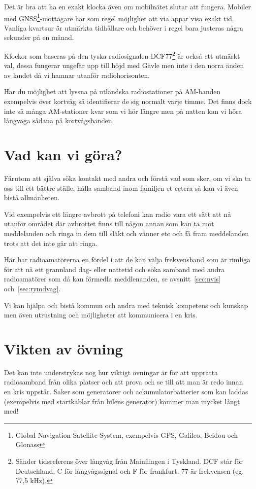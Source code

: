 Det är bra att ha en exakt klocka även om mobilnätet slutar att fungera.
Mobiler med GNSS\footnote{Global Navigation Satellite System, exempelvis GPS,
Galileo, Beidou och Glonass}-mottagare har som regel möjlighet att via appar
visa exakt tid. Vanliga kvartsur är utmärkta tidhållare och behöver i regel
bara justeras några sekunder på en månad.

Klockor som baseras på den tyska radiosignalen DCF77\footnote{Sänder
tidsreferens över långvåg från Mainflingen i Tyskland. DCF står för
Deutschland, C för långvågssignal och F för frankfurt. 77 är frekvensen (eg.
77,5 kHz).} är också ett utmärkt val, dessa fungerar ungefär upp till höjd med
Gävle men inte i den norra änden av landet då vi hamnar utanför
radiohorisonten.

Har du möjlighet att lyssna på utländska radiostationer på AM-banden
exempelvis över kortvåg så identifierar de sig normalt varje timme. Det finns
dock inte så många AM-stationer kvar som vi hör längre men på natten kan vi
höra långväga sådana på kortvågsbanden.

\section{Vad kan vi göra?}

Färutom att själva söka kontakt med andra och förstå vad som sker, om vi ska
ta oss till ett bättre ställe, hålla samband inom familjen et cetera så kan vi
även bistå allmänheten.

Vid exempelvis ett längre avbrott på telefoni kan radio vara ett sätt att nå
utanför området där avbrottet finns till någon annan som kan ta mot
meddelanden och ringa in dem till släkt och vänner etc och få fram meddelanden
trots att det inte går att ringa.

Här har radioamatörerna en fördel i att de kan välja frekvensband som är
rimliga för att nå ett grannland dag- eller nattetid och söka samband med
andra radioamatörer som då kan förmedla meddlenanden, se
avsnitt~\ref{sec:nvis} och~\ref{sec:rymdvag}.

Vi kan hjälpa och bistå kommun och andra med teknisk kompetens och kunskap men
även utrustning och möjligheter att kommunicera i en kris.


\section{Vikten av övning}

Det kan inte understrykas nog hur viktigt övningar är för att upprätta
radiosamband från olika platser och att prova och se till att man är redo
innan en kris uppstår. Saker som generatorer och ackumulatorbatterier som kan
laddas (exempelvis med startkablar från bilens generator) kommer man mycket
långt med!


